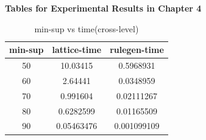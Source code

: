 \bf {Tables for Experimental Results in Chapter 4}
\begin{table}
  \centering
  \begin{tabular}{|c|c|c|}
     \hline
     min-sup & lattice-time	 & rulegen-time \\
     \hline
     50 & 10.03415 & 0.5968931 \\
     \hline
     60 & 2.64441 & 0.0348959 \\
     \hline
     70 & 0.991604 & 0.02111267 \\
     \hline
     80 & 0.6282599 & 0.01165509 \\
     \hline
     90 & 0.05463476 & 0.001099109 \\
     \hline
   \end{tabular}
  \caption{ min-sup vs time(cross-level)}\label{clmst}
\end{table}


